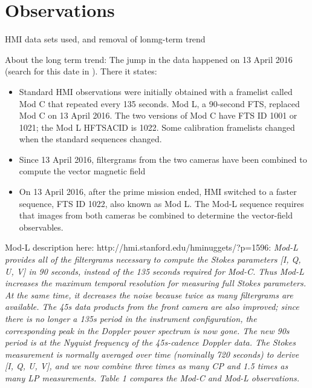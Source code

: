 \documentclass[twocolumn,linenumbers,trackchanges]{aastex631}
\begin{document}
\cite[]{2013A&A...555A..33B}

\cite[]{2021arXiv210508657F}

\cite[]{2021arXiv210514533R}

\cite[]{ballot2021change}

\section{Observations}

HMI data sets used, and removal of lonmg-term trend

About the long term trend: The jump in the data happened on 13 April 2016 (search for this date in \cite{2018SoPh..293...45H}). There it states:
\begin{itemize}
\item Standard HMI observations were initially obtained with a framelist called Mod C that
repeated every 135 seconds. Mod L, a 90-second FTS, replaced Mod C on 13 April 2016.
The two versions of Mod C have FTS ID 1001 or 1021; the Mod L HFTSACID is 1022.
Some calibration framelists changed when the standard sequences changed.
\item Since 13 April
2016, filtergrams from the two cameras have been combined to compute the vector magnetic
field \cite[]{2014SoPh..289.3483H,2016SoPh..291.1887C}
\item On 13 April 2016, after the prime mission ended, HMI switched to
a faster sequence, FTS ID 1022, also known as Mod L. The Mod-L sequence requires that
images from both cameras be combined to determine the vector-field observables. 
\end{itemize}
Mod-L description here: http://hmi.stanford.edu/hminuggets/?p=1596: \textsl{
Mod-L provides all of the filtergrams necessary to compute the Stokes parameters [I, Q, U, V] in 90 seconds, instead of the 135 seconds required for Mod-C. Thus Mod-L increases the maximum temporal resolution for measuring full Stokes parameters. At the same time, it decreases the noise because twice as many filtergrams are available. The 45s data products from the front camera are also improved; since there is no longer a 135s period in the instrument configuration, the corresponding peak in the Doppler power spectrum is now gone. The new 90s period is at the Nyquist frequency of the 45s-cadence Doppler data. The Stokes measurement is normally averaged over time (nominally 720 seconds) to derive [I, Q, U, V], and we now combine three times as many CP and 1.5 times as many LP measurements. Table 1 compares the Mod-C and Mod-L observations.}
\end{document}
